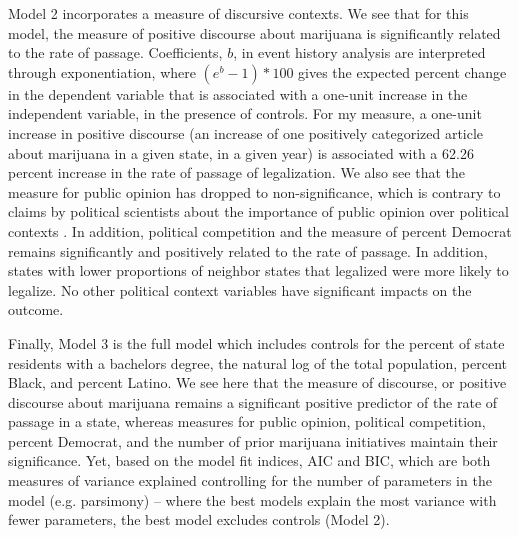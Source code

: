 %



%


%


%







Model 2 incorporates a measure of discursive contexts. We see that for this model, the measure of positive discourse about marijuana is significantly related to the rate of passage. 
Coefficients, $b$, in event history analysis are interpreted through exponentiation, where $(e^{b} - 1)*100$ gives the expected percent change in the dependent variable that is associated with a one-unit increase in the independent variable, in the presence of controls. For my measure, a one-unit increase in positive discourse (an increase of one positively categorized article about marijuana in a given state, in a given year) is associated with a 62.26 percent increase in the rate of passage of legalization. We also see that the measure for public opinion has dropped to non-significance, which is contrary to claims by political scientists about the importance of public opinion over political contexts \citep{burstein_and_linton_2002}. In addition, political competition and the measure of percent Democrat remains significantly and positively related to the rate of passage. In addition, states with lower proportions of neighbor states that legalized were more likely to legalize. No other political context variables have significant impacts on the outcome.

Finally, Model 3 is the full model which includes controls for the percent of state residents with a bachelors degree, the natural log of the total population, percent Black, and percent Latino. We see here that the measure of discourse, or positive discourse about marijuana remains a significant positive predictor of the rate of passage in a state, whereas measures for public opinion, political competition, percent Democrat, and the number of prior marijuana initiatives maintain their significance. Yet, based on the model fit indices, AIC and BIC, which are both measures of variance explained controlling for the number of parameters in the model (e.g. parsimony) -- where the best models explain the most variance with fewer parameters, the best model excludes controls (Model 2).



